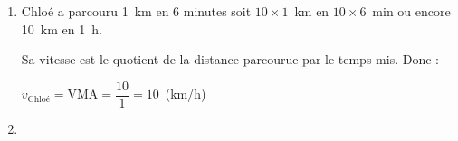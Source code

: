 
\medskip

%
%
%

\begin{enumerate}
\item %
Chloé a parcouru 1~km en 6 minutes soit $10 \times 1$~km en $10 \times 6$~min ou encore 10~km en 1~h.

Sa vitesse  est le quotient de la distance parcourue par le temps mis. Donc :

$v_{\text{Chloé}} = \text{VMA} =  \dfrac{10}{1} = 10$~(km/h)
\item %


\end{enumerate}
